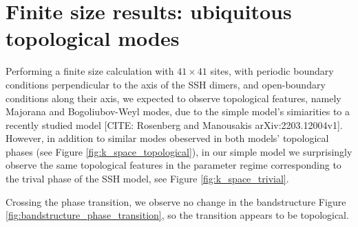 

\newpage
\section{Finite size results: ubiquitous topological modes}
Performing a finite size calculation with $41\times41$ sites, with periodic boundary conditions perpendicular to the axis of the SSH dimers, and open-boundary conditions along their axis, we expected to observe topological features, namely Majorana and Bogoliubov-Weyl modes,
due to the simple model's simiarities to a recently studied model [CITE: Rosenberg and Manousakis arXiv:2203.12004v1].
However, in addition to similar modes obeserved in both models' topological phases 
(see Figure \ref{fig:k_space_topological}),
in our simple model
we surprisingly observe the same topological features in the parameter regime corresponding to the trival phase of the SSH model,
see Figure \ref{fig:k_space_trivial}.




Crossing the phase transition, we observe no change in the bandstructure Figure \ref{fig:bandstructure_phase_transition}, so the transition appears to be topological.


